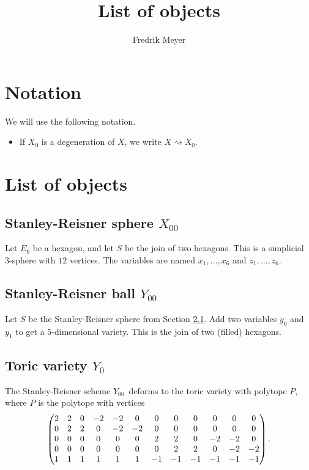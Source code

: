 \documentclass[11pt, english]{article}
\begin{document}
\title{List of objects}
\author{Fredrik Meyer}
\maketitle

\tableofcontents 

\section{Notation}

We will use the following notation.

\begin{itemize}
	\item If $X_0$ is a degeneration of $X$, we write $X \rightsquigarrow X_0$.
\end{itemize}

\section{List of objects}

\subsection{Stanley-Reisner sphere $X_{00}$}
\label{sec:x00}

Let $E_6$ be a hexagon, and let $S$ be the join of two hexagons. This is a simplicial 3-sphere with $12$ vertices. The variables are named $x_1,\ldots,x_6$ and $z_1,\ldots,z_6$.

\subsection{Stanley-Reisner ball $Y_{00}$}
\label{sec:y00}

Let $S$ be the Stanley-Reisner sphere from Section \ref{sec:x00}. Add two variables $y_0$ and $y_1$ to get a $5$-dimensional variety. This is the join of two (filled) hexagons.

\subsection{Toric variety $Y_0$}
\label{sec:y0}

The Stanley-Reisner scheme $Y_{00}$ deforms to the toric variety with polytope $P$, where $P$ is the polytope with vertices 
\[
\setcounter{MaxMatrixCols}{20}
\begin{pmatrix}
2 & 2 & 0 & -2 & -2 & 0 & 0 & 0 & 0 & 0 & 0 & 0 \\
0 & 2 & 2 & 0  & -2 & -2 & 0 & 0 & 0 & 0 & 0 & 0 \\
0 & 0 & 0 & 0  &  0 &  0 & 2 & 2 & 0 &-2 & -2 & 0 \\
0 & 0 & 0 & 0  &  0 &  0 & 0 & 2 & 2 & 0 & -2 & -2 \\
1 & 1 & 1 & 1  & 1 &   1 & -1 & -1 & -1 & -1 & -1 & -1
\end{pmatrix}.
\]
\end{document}
